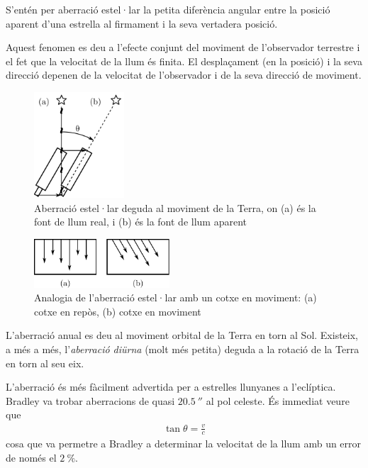 S'entén per aberració estel·lar la petita diferència angular entre la posició aparent d'una estrella al firmament i la seva vertadera posició.

Aquest fenomen es deu a l'efecte conjunt del moviment de l'observador terrestre i el fet que la velocitat de la llum és finita. El desplaçament (en la posició) i la seva direcció depenen de la velocitat de l'observador i de la seva direcció de moviment.
\begin{figure}[h]
	\centering
	\includegraphics[width=0.3\textwidth]{./images/1-aberration}
	\caption{Aberració estel·lar deguda al moviment de la Terra, on (a) és la font de llum real, i (b) és la font de llum aparent}
	\label{fig:aberration}
\end{figure}
\begin{figure}[h]
	\centering
	\includegraphics[width=0.45\textwidth]{./images/1-aberration-analogy}
	\caption{Analogia de l'aberració estel·lar amb un cotxe en moviment: (a) cotxe en repòs, (b) cotxe en moviment}
	\label{fig:aberration-analogy}
\end{figure}

L'aberració anual es deu al moviment orbital de la Terra en torn al Sol. Existeix, a més a més, l'\textit{aberració diürna} (molt més petita) deguda a la rotació de la Terra en torn al seu eix.

L'aberració és més fàcilment advertida per a estrelles llunyanes a l'eclíptica. Bradley va trobar aberracions de quasi $\SI{20.5}{\arcsecond}$ al pol celeste. És immediat veure que
\begin{align}
	\tan \theta = \frac{v}{c}
\end{align}
cosa que va permetre a Bradley a determinar la velocitat de la llum amb un error de només el $\SI{2}{\percent}$.


